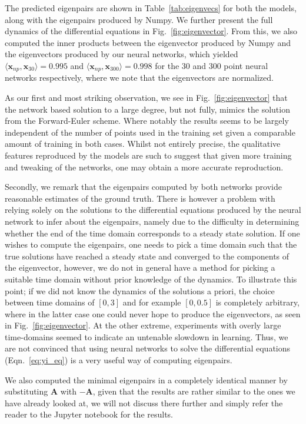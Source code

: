 \documentclass[reprint, english, nofootinbib]{revtex4-2}
\begin{document}
The predicted eigenpairs are shown in Table~\ref{tab:eigenvecs} for both the models, along with the eigenpairs produced by Numpy. We further present the full dynamics of the differential equations in Fig.~\ref{fig:eigenvector}. From this, we also computed the inner products between the eigenvector produced by Numpy and the eigenvectors produced by our neural networks, which yielded $\langle \pmb x_{np}, \pmb x_{30}\rangle = 0.995$ and $\langle \pmb x_{np}, \pmb x_{300}\rangle = 0.998$ for the 30 and 300 point neural networks respectively, where we note that the eigenvectors are normalized.

As our first and most striking observation, we see in Fig.~\ref{fig:eigenvector} that the network based solution to a large degree, but not fully, mimics the solution from the Forward-Euler scheme. Where notably the results seems to be largely independent of the number of points used in the training set given a comparable amount of training in both cases. Whilst not entirely precise, the qualitative features reproduced by the models are such to suggest that given more training and tweaking of the networks, one may obtain a more accurate reproduction.

Secondly, we remark that the eigenpairs computed by both networks provide reasonable estimates of the ground truth. There is however a problem with relying solely on the solutions to the differential equations produced by the neural network to infer about the eigenpairs, namely due to the difficulty in determining whether the end of the time domain corresponds to a steady state solution. If one wishes to compute the eigenpairs, one needs to pick a time domain such that the true solutions have reached a steady state and converged to the components of the eigenvector, however, we do not in general have a method for picking a suitable time domain without prior knowledge of the dynamics. To illustrate this point; if we did not know the dynamics of the solutions a priori, the choice between time domains of $[0,3]$ and for example $[0,0.5]$ is completely arbitrary, where in the latter case one could never hope to produce the eigenvectors, as seen in Fig.~\ref{fig:eigenvector}. At the other extreme, experiments with overly large time-domains seemed to indicate an untenable slowdown in learning. Thus, we are not convinced that using neural networks to solve the differential equations (Eqn.~\ref{eq:yi_eq}) is a very useful way of computing eigenpairs.

We also computed the minimal eigenpairs in a completely identical manner by substituting $\mathbf A$ with $- \mathbf A$, given that the results are rather similar to the ones we have already looked at, we will not discuss there further and simply refer the reader to the Jupyter notebook for the results.
\end{document}
